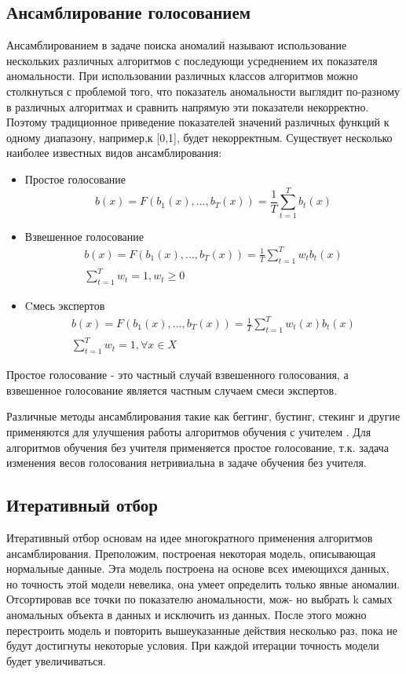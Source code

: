 \subsection{Ансамблирование голосованием}
Ансамблированием в задаче поиска аномалий называют использование нескольких различных алгоритмов с последующи усреднением их показателя аномальности. При использовании различных классов алгоритмов можно столкнуться с проблемой того, что показатель аномальности выглядит по-разному в различных алгоритмах и сравнить напрямую эти показатели некорректно.  Поэтому традиционное приведение  показателей значений различных функций к одному диапазону, например,к [0,1], будет некорректным.
Существует несколько наиболее известных видов ансамблирования:
\begin{itemize}
	\item Простое голосование 
	\begin{equation}
	b(x)=F(b_1(x),...,b_T(x))=\frac{1}{T}\sum_{t=1}^{T}b_t(x)
	\end{equation}
	\item Взвешенное голосование 
	\begin{gather}
	b(x)=F(b_1(x),...,b_T(x))=\frac{1}{T}\sum_{t=1}^{T}w_tb_t(x)\\
		\sum_{t=1}^{T}w_t=1, w_t \geq 0
	\end{gather}
		\item Cмесь экспертов
		\begin{gather}
		b(x)=F(b_1(x),...,b_T(x))=\frac{1}{T}\sum_{t=1}^{T}w_t(x)b_t(x)\\
		\sum_{t=1}^{T}w_t=1, \forall x\in X
		\end{gather}
 \end{itemize}
	Простое голосование - это  частный случай взвешенного голосования, а взвешенное голосование является частным случаем смеси экспертов. 
	
	Различные методы ансамблирования такие как беггинг, бустинг, стекинг и другие применяются для улучшения работы алгоритмов обучения с учителем \cite{Book16}. Для алгоритмов обучения без учителя применяется простое голосование, т.к. задача изменения весов голосования нетривиальна в задаче обучения без учителя.
\subsection{Итеративный отбор}
Итеративный отбор основам на идее многократного применения алгоритмов ансамблирования. Преположим, построеная некоторая модель, описывающая нормальные данные. Эта модель построена на основе всех  имеющихся данных, но точность этой модели невелика, она умеет определить только явные аномалии. Отсортировав все точки по показателю аномальности, мож-
но выбрать k самых аномальных объекта в данных и исключить из данных. После этого можно перестроить модель и повторить вышеуказанные действия несколько раз, пока не будут достигнуты некоторые условия. При каждой итерации точность модели будет увеличиваться.

